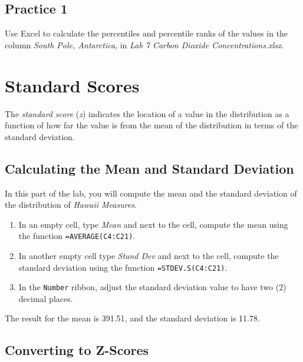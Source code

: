 \documentclass[
  12pt,
  letterpaper,
]{book}
\providecommand{\tightlist}{%
  \setlength{\itemsep}{0pt}\setlength{\parskip}{0pt}}
\begin{document}
\hypertarget{practice-1-5}{%
\subsection{Practice 1}\label{practice-1-5}}

Use Excel to calculate the percentiles and percentile ranks of the values in the column \emph{South Pole, Antarctica}, in \emph{Lab 7 Carbon Dioxide Concentrations.xlsx}.

\hypertarget{standard-scores}{%
\section{Standard Scores}\label{standard-scores}}

The \emph{standard score} (\emph{z}) indicates the location of a value in the distribution as a function of how far the value is from the mean of the distribution in terms of the standard deviation.

\hypertarget{mean-st-dev}{%
\subsection{Calculating the Mean and Standard Deviation}\label{mean-st-dev}}

In this part of the lab, you will compute the mean and the standard deviation of the distribution of \emph{Hawaii Measures}.

\begin{enumerate}
\def\labelenumi{\arabic{enumi}.}
\tightlist
\item
  In an empty cell, type \emph{Mean} and next to the cell, compute the mean using the function \texttt{=AVERAGE(C4:C21)}.
\item
  In another empty cell type \emph{Stand Dev} and next to the cell, compute the standard deviation using the function \texttt{=STDEV.S(C4:C21)}.
\item
  In the \texttt{Number} ribbon, adjust the standard deviation value to have two (2) decimal places.
\end{enumerate}

The result for the mean is 391.51, and the standard deviation is 11.78.

\hypertarget{converting-to-z-scores}{%
\subsection{Converting to Z-Scores}\label{converting-to-z-scores}}
\end{document}
